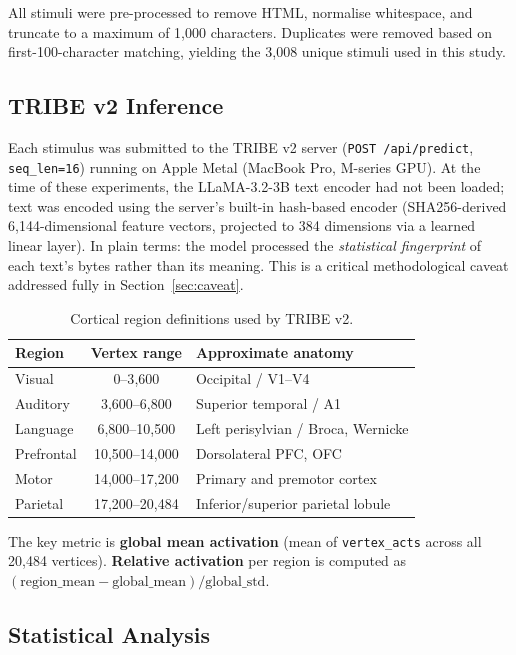 \documentclass[11pt,letterpaper]{article}
\begin{document}
All stimuli were pre-processed to remove HTML, normalise whitespace, and truncate to a maximum of 1{,}000 characters. Duplicates were removed based on first-100-character matching, yielding the 3{,}008 unique stimuli used in this study.

\subsection{TRIBE v2 Inference}

Each stimulus was submitted to the TRIBE v2 server (\texttt{POST /api/predict}, \texttt{seq\_len=16}) running on Apple Metal (MacBook Pro, M-series GPU). At the time of these experiments, the LLaMA-3.2-3B text encoder had not been loaded; text was encoded using the server's built-in hash-based encoder (SHA256-derived 6{,}144-dimensional feature vectors, projected to 384 dimensions via a learned linear layer). In plain terms: the model processed the \textit{statistical fingerprint} of each text's bytes rather than its meaning. This is a critical methodological caveat addressed fully in Section~\ref{sec:caveat}.

\begin{table}[ht]
\centering
\small
\caption{Cortical region definitions used by TRIBE v2.}
\label{tab:regions}
\begin{tabular}{l c l}
\toprule
\textbf{Region} & \textbf{Vertex range} & \textbf{Approximate anatomy} \\
\midrule
Visual     & 0--3{,}600       & Occipital / V1--V4 \\
Auditory   & 3{,}600--6{,}800  & Superior temporal / A1 \\
Language   & 6{,}800--10{,}500 & Left perisylvian / Broca, Wernicke \\
Prefrontal & 10{,}500--14{,}000 & Dorsolateral PFC, OFC \\
Motor      & 14{,}000--17{,}200 & Primary and premotor cortex \\
Parietal   & 17{,}200--20{,}484 & Inferior/superior parietal lobule \\
\bottomrule
\end{tabular}
\end{table}

The key metric is \textbf{global mean activation} (mean of \texttt{vertex\_acts} across all 20{,}484 vertices). \textbf{Relative activation} per region is computed as $(\mathrm{region\_mean} - \mathrm{global\_mean}) / \mathrm{global\_std}$.

\subsection{Statistical Analysis}
\end{document}
